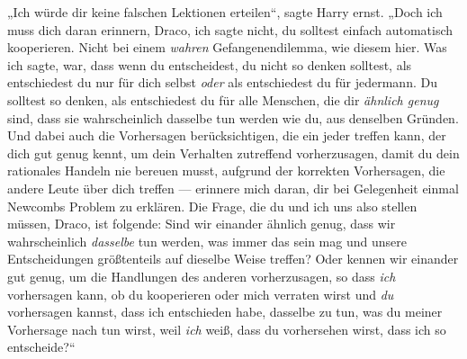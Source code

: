 „Ich würde dir keine falschen Lektionen erteilen“, sagte Harry ernst.
„Doch ich muss dich daran erinnern, Draco, ich sagte nicht, du solltest einfach automatisch kooperieren. Nicht bei einem \emph{wahren} Gefangenendilemma, wie diesem hier. Was ich sagte, war, dass wenn du entscheidest, du nicht so denken solltest, als entschiedest du nur für dich selbst \emph{oder} als entschiedest du für jedermann. Du solltest so denken, als entschiedest du für alle Menschen, die dir \emph{ähnlich genug} sind, dass sie wahrscheinlich dasselbe tun werden wie du, aus denselben Gründen. Und dabei auch die Vorhersagen berücksichtigen, die ein jeder treffen kann, der dich gut genug kennt, um dein Verhalten zutreffend vorherzusagen, damit du dein rationales Handeln nie bereuen musst, aufgrund der korrekten Vorhersagen, die andere Leute über dich treffen — erinnere mich daran, dir bei Gelegenheit einmal Newcombs Problem zu erklären. Die Frage, die du und ich uns also stellen müssen, Draco, ist folgende: Sind wir einander ähnlich genug, dass wir wahrscheinlich \emph{dasselbe} tun werden, was immer das sein mag und unsere Entscheidungen größtenteils auf dieselbe Weise treffen? Oder kennen wir einander gut genug, um die Handlungen des anderen vorherzusagen, so dass \emph{ich} vorhersagen kann, ob du kooperieren oder mich verraten wirst und \emph{du} vorhersagen kannst, dass ich entschieden habe, dasselbe zu tun, was du meiner Vorhersage nach tun wirst, weil \emph{ich} weiß, dass du vorhersehen wirst, dass ich so entscheide?“

